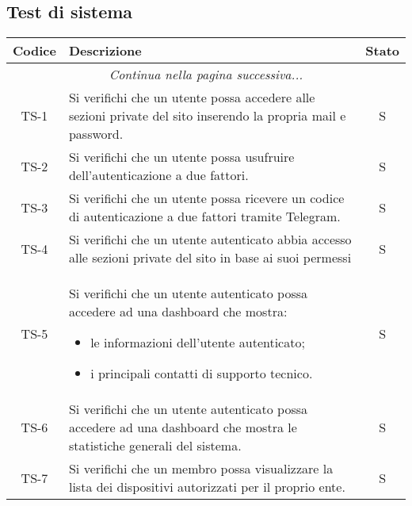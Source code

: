 	\subsection{Test di sistema}
		\begin{center}
			\begin{longtable}{|c|p{10cm}|c|}
			\hline
			\rowcolor{lighter-grayer}
			\textbf{Codice} & \textbf{Descrizione} & \textbf{Stato}  \\
			\hline
			\endhead
			\hline
	        \multicolumn{3}{|c|}{\textit{Continua nella pagina successiva...}}\\
	        \hline
	        \endfoot
	        \endlastfoot

			\hline
			 TS-1 & Si verifichi che un utente possa accedere alle sezioni private del sito inserendo la propria mail e password.
			  & S \\
			 \hline
			 TS-2 & Si verifichi che un utente possa usufruire dell'autenticazione a due fattori. & S \\
			 \hline
			 TS-3 & Si verifichi che un utente possa ricevere un codice di autenticazione a due fattori tramite Telegram. & S \\
			 \hline
			 TS-4 & Si verifichi che un utente autenticato abbia accesso alle sezioni private del sito in base ai suoi permessi & S \\
			 \hline
			 TS-5 & Si verifichi che un utente autenticato possa accedere ad una dashboard che mostra:
			 \begin{itemize}
			 	\item le informazioni dell'utente autenticato;
			 	\item i principali contatti di supporto tecnico.
			 \end{itemize} & S \\
			 \hline
			 TS-6 & Si verifichi che un utente autenticato possa accedere ad una dashboard che mostra le statistiche generali del sistema. & S \\
			 \hline
			 TS-7 & Si verifichi che un membro possa visualizzare la lista dei dispositivi autorizzati per il proprio ente. & S \\
			 \hline

\end{longtable}
\end{center}
